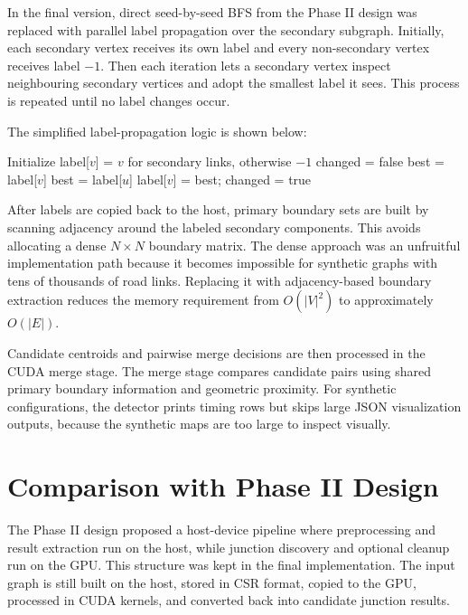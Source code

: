 \documentclass[conference]{IEEEtran}
\begin{document}
In the final version, direct seed-by-seed BFS from the Phase II design was replaced with parallel label propagation over the secondary subgraph. Initially, each secondary vertex receives its own label and every non-secondary vertex receives label $-1$. Then each iteration lets a secondary vertex inspect neighbouring secondary vertices and adopt the smallest label it sees. This process is repeated until no label changes occur.

The simplified label-propagation logic is shown below:

\begin{algorithmic}[1]
\STATE Initialize label[$v$] = $v$ for secondary links, otherwise $-1$
\REPEAT
    \STATE changed = false
        \STATE best = label[$v$]
                \STATE best = label[$u$]
            \ENDIF
        \ENDFOR
            \STATE label[$v$] = best; changed = true
        \ENDIF
    \ENDFOR
{}
\end{algorithmic}

After labels are copied back to the host, primary boundary sets are built by scanning adjacency around the labeled secondary components. This avoids allocating a dense $N \times N$ boundary matrix. The dense approach was an unfruitful implementation path because it becomes impossible for synthetic graphs with tens of thousands of road links. Replacing it with adjacency-based boundary extraction reduces the memory requirement from $O(|V|^2)$ to approximately $O(|E|)$.

Candidate centroids and pairwise merge decisions are then processed in the CUDA merge stage. The merge stage compares candidate pairs using shared primary boundary information and geometric proximity. For synthetic configurations, the detector prints timing rows but skips large JSON visualization outputs, because the synthetic maps are too large to inspect visually.

\section{Comparison with Phase II Design}

The Phase II design proposed a host-device pipeline where preprocessing and result extraction run on the host, while junction discovery and optional cleanup run on the GPU. This structure was kept in the final implementation. The input graph is still built on the host, stored in CSR format, copied to the GPU, processed in CUDA kernels, and converted back into candidate junction results.
\end{document}
